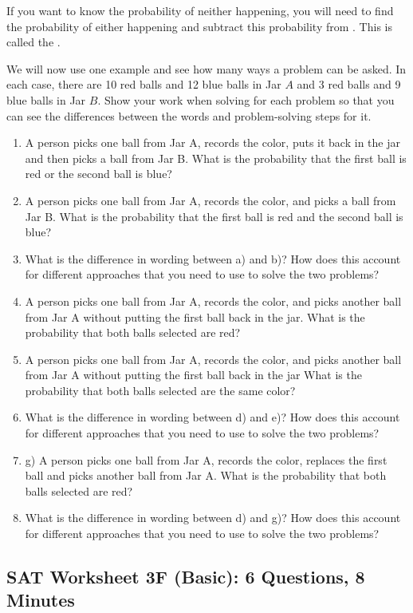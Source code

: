 \documentclass[12pt]{book}
\newcommand{\longline}{\underline{\hspace{2in}} }
\newcommand{\shortline}{\underline{\hspace{1in}}}
\begin{document}
\vfill
If you want to know the probability of neither happening, you will need to find the probability of either happening and subtract this probability from \shortline. This is called the \longline.

\vfill
\newpage
We will now use one example and see how many ways a problem can be asked. In each case, there are 10 red balls and 12 blue balls in Jar $A$ and 3 red balls and 9 blue balls in Jar $B$. Show your work when solving for each problem so that you can see the differences between the words and problem-solving steps for it. 

\begin{enumerate}[label=\alph*)]
\item A person picks one ball from Jar A, records the color, puts it back in the jar and then picks a ball from Jar B. What is the probability that the first ball is red or the second ball is blue?
\vfill\item A person picks one ball from Jar A, records the color, and picks a ball from Jar B. What is the probability that the first ball is red and the second ball is blue?
\vfill\item What is the difference in wording between a) and b)? How does this account for different approaches that you need to use to solve the two problems?
\vfill\item A person picks one ball from Jar A, records the color, and picks another ball from Jar A without putting the first ball back in the jar. What is the probability that both balls selected are red?
\vfill\item A person picks one ball from Jar A, records the color, and picks another ball from Jar A without putting the first ball back in the jar What is the probability that both balls selected are the same color?
\vfill\item What is the difference in wording between d) and e)? How does this account for different approaches that you need to use to solve the two problems?
\vfill\item g)	A person picks one ball from Jar A, records the color, replaces the first ball and picks another ball from Jar A. What is the probability that both balls selected are red?
\vfill\item What is the difference in wording between d) and g)? How does this account for different approaches that you need to use to solve the two problems?
\end{enumerate}

\vfill
\newpage
\subsection{SAT Worksheet 3F (Basic): 6 Questions, 8 Minutes}
\end{document}
